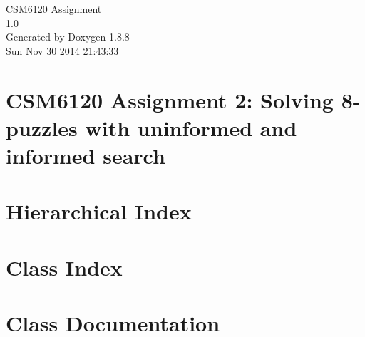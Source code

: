\documentclass[twoside]{book}
\newcommand{\+}{\discretionary{\mbox{\scriptsize$\hookleftarrow$}}{}{}}
\newcommand{\clearemptydoublepage}{%
  \newpage{\pagestyle{empty}\cleardoublepage}%
}
\begin{document}
\hypersetup{pageanchor=false,
             bookmarks=true,
             bookmarksnumbered=true,
             pdfencoding=unicode
            }
\begin{titlepage}
\vspace*{7cm}
\begin{center}%
{\Large C\+S\+M6120 Assignment \\[1ex]\large 1.\+0 }\\
\vspace*{1cm}
{\large Generated by Doxygen 1.8.8}\\
\vspace*{0.5cm}
{\small Sun Nov 30 2014 21:43:33}\\
\end{center}
\end{titlepage}
\clearemptydoublepage
\tableofcontents
\clearemptydoublepage
{}
\hypersetup{pageanchor=true}

\chapter{C\+S\+M6120 Assignment 2\+: Solving 8-\/puzzles with uninformed and informed search}
\label{d8/de6/md__c_1__users__stefan__documents__git_hub__c_s_m6120__assignment2__r_e_a_d_m_e}
\hypertarget{d8/de6/md__c_1__users__stefan__documents__git_hub__c_s_m6120__assignment2__r_e_a_d_m_e}{}

\chapter{Hierarchical Index}

\chapter{Class Index}

\chapter{Class Documentation}














\newpage
{}
{}
\printindex
\end{document}
